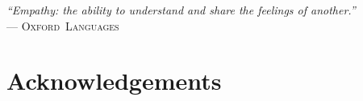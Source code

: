 \documentclass[../infufrgs/ppgc-tese.tex]{subfiles}
\begin{document}
\begin{flushright}
\mbox{}\vfill
{\sffamily\itshape
``Empathy: the ability to understand and share the feelings of another.''\\}
--- \textsc{Oxford~Languages}
\end{flushright}

\chapter*{Acknowledgements}

\end{document}
